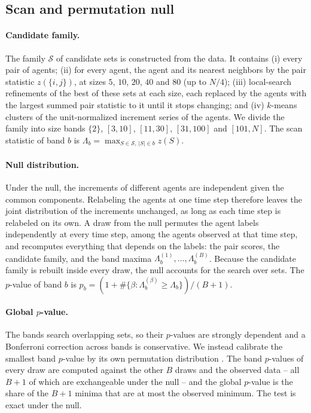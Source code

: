 \documentclass{article}
\theoremstyle{plain}
\theoremstyle{definition}
\newcommand{\Sfam}{\mathcal{S}}
\begin{document}
\subsection{Scan and permutation null}
\label{sec:scan}

\paragraph{Candidate family.} The family $\Sfam$ of candidate sets is constructed from the data. It contains (i) every pair of agents; (ii) for every agent, the agent and its nearest neighbors by the pair statistic $z(\{i,j\})$, at sizes $5$, $10$, $20$, $40$ and $80$ (up to $N/4$); (iii) local-search refinements of the best of these sets at each size, each replaced by the agents with the largest summed pair statistic to it until it stops changing; and (iv) $k$-means clusters of the unit-normalized increment series of the agents. We divide the family into size bands $\{2\}$, $[3,10]$, $[11,30]$, $[31,100]$ and $[101,N]$. The scan statistic of band $b$ is $\Lambda_b = \max_{S\in\Sfam,\,|S|\in b} z(S)$.

\paragraph{Null distribution.} Under the null, the increments of different agents are independent given the common components. Relabeling the agents at one time step therefore leaves the joint distribution of the increments unchanged, as long as each time step is relabeled on its own. A draw from the null permutes the agent labels independently at every time step, among the agents observed at that time step, and recomputes everything that depends on the labels: the pair scores, the candidate family, and the band maxima $\Lambda_b^{(1)},\dots,\Lambda_b^{(B)}$. Because the candidate family is rebuilt inside every draw, the null accounts for the search over sets. The $p$-value of band $b$ is $p_b = (1+\#\{\beta:\Lambda_b^{(\beta)}\ge\Lambda_b\})/(B+1)$.

\paragraph{Global $p$-value.} The bands search overlapping sets, so their $p$-values are strongly dependent and a Bonferroni correction across bands is conservative. We instead calibrate the smallest band $p$-value by its own permutation distribution \citep{westfall1993resampling}. The band $p$-values of every draw are computed against the other $B$ draws and the observed data -- all $B+1$ of which are exchangeable under the null -- and the global $p$-value is the share of the $B+1$ minima that are at most the observed minimum. The test is exact under the null.
\end{document}
